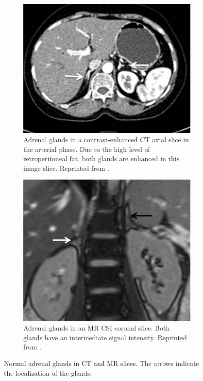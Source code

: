 \documentclass[11pt]{article}
\begin{document}
\begin{figure}
    \centering
    \begin{subfigure}[b]{0.45\textwidth}
        \centering
        \includegraphics[width=\textwidth]{figures/CT_adrenal_enhanced.png}
        \caption{Adrenal glands in a contrast-enhanced CT axial slice in the arterial phase. Due to the high level of retroperitoneal fat, both glands are enhanced in this image slice. Reprinted from \cite{Panda2015}.}
        \label{fig:adrenal_ct}
    \end{subfigure}
    \hfill
    \begin{subfigure}[b]{0.45\textwidth}
        \centering
        \includegraphics[width=\textwidth]{figures/MRI_adrenal.png}
        \caption{Adrenal glands in an MR CSI coronal slice. Both glands have an intermediate signal intensity. Reprinted from \cite{Panda2015}. }
        \label{fig:adrenal_mri}
    \end{subfigure}
    \caption{Normal adrenal glands in CT and MR slices. The arrows indicate the localization of the glands.}
    \label{fig:adrenal_glands_normal}
\end{figure}
\end{document}
